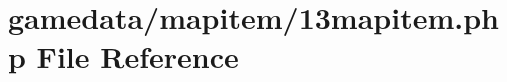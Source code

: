 \hypertarget{13mapitem_8php}{\section{gamedata/mapitem/13mapitem.php File Reference}
\label{13mapitem_8php}
}
